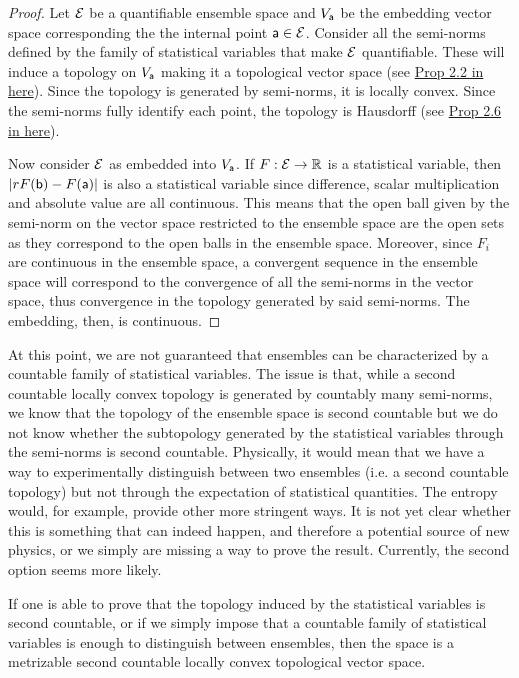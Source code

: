 \begin{proof}
	Let $\Ens$ be a quantifiable ensemble space and $V_{\ens[a]}$ be the embedding vector space corresponding the the internal point $\ens[a] \in \Ens$. Consider all the semi-norms defined by the family of statistical variables that make $\Ens$ quantifiable. These will induce a topology on $V_{\ens[a]}$ making it a topological vector space (see \href{https://personal.math.ubc.ca/~cass/research/pdf/TVS.pdf}{Prop 2.2 in here}). Since the topology is generated by semi-norms, it is locally convex. Since the semi-norms fully identify each point, the topology is Hausdorff (see \href{https://personal.math.ubc.ca/~cass/research/pdf/TVS.pdf}{Prop 2.6 in here}).
	
	Now consider $\Ens$ as embedded into $V_{\ens[a]}$. If $F : \Ens \to \mathbb{R}$ is a statistical variable, then $|r F(\ens[b]) - F(\ens[a]) |$ is also a statistical variable since difference, scalar multiplication and absolute value are all continuous. This means that the open ball given by the semi-norm on the vector space restricted to the ensemble space are the open sets as they correspond to the open balls in the ensemble space. Moreover, since $F_i$ are continuous in the ensemble space, a convergent sequence in the ensemble space will correspond to the convergence of all the semi-norms in the vector space, thus convergence in the topology generated by said semi-norms. The embedding, then, is continuous.
\end{proof}

At this point, we are not guaranteed that ensembles can be characterized by a countable family of statistical variables. The issue is that, while a second countable locally convex topology is generated by countably many semi-norms, we know that the topology of the ensemble space is second countable but we do not know whether the subtopology generated by the statistical variables through the semi-norms is second countable. Physically, it would mean that we have a way to experimentally distinguish between two ensembles (i.e. a second countable topology) but not through the expectation of statistical quantities. The entropy would, for example, provide other more stringent ways. It is not yet clear whether this is something that can indeed happen, and therefore a potential source of new physics, or we simply are missing a way to prove the result. Currently, the second option seems more likely.

If one is able to prove that the topology induced by the statistical variables is second countable, or if we simply impose that a countable family of statistical variables is enough to distinguish between ensembles, then the space is a metrizable second countable locally convex topological vector space.

